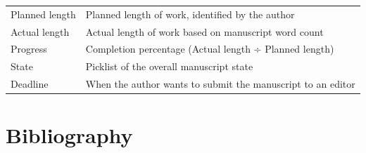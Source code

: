 \documentclass[10pt,openany]{book}
\begin{document}
\begin{longtable}[]{@{}ll@{}}
\begin{minipage}[t]{0.21\columnwidth}\raggedright
Planned length\strut
\end{minipage} & \begin{minipage}[t]{0.73\columnwidth}\raggedright
Planned length of work, identified by the author\strut
\end{minipage}\tabularnewline
\begin{minipage}[t]{0.21\columnwidth}\raggedright
Actual length\strut
\end{minipage} & \begin{minipage}[t]{0.73\columnwidth}\raggedright
Actual length of work based on manuscript word count\strut
\end{minipage}\tabularnewline
\begin{minipage}[t]{0.21\columnwidth}\raggedright
Progress\strut
\end{minipage} & \begin{minipage}[t]{0.73\columnwidth}\raggedright
Completion percentage (Actual length ÷ Planned length)\strut
\end{minipage}\tabularnewline
\begin{minipage}[t]{0.21\columnwidth}\raggedright
State\strut
\end{minipage} & \begin{minipage}[t]{0.73\columnwidth}\raggedright
Picklist of the overall manuscript state\strut
\end{minipage}\tabularnewline
\begin{minipage}[t]{0.21\columnwidth}\raggedright
Deadline\strut
\end{minipage} & \begin{minipage}[t]{0.73\columnwidth}\raggedright
When the author wants to submit the manuscript to an editor\strut
\end{minipage}\tabularnewline
\bottomrule
\end{longtable}

\newpage

\hypertarget{bibliography}{%
\section*{Bibliography}\label{bibliography}}
\end{document}
